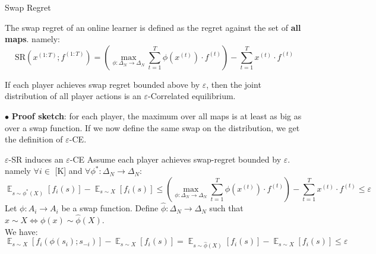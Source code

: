 \documentclass[aspectratio=169,xcolor=dvipsnames,t]{beamer}
\DeclareMathOperator*{\expectation}{\mathbb{E}}
\begin{document}
\begin{frame}[label=current]{Swap Regret}
    \begin{definition}
        The \color{MediumRed} swap regret \color{black} of an online learner is defined as the regret against the set of \textbf{all maps}. namely:
        \begin{equation*}
            \text{SR}(x^{(1:T)};f^{(1:T)}) = \left(\max_{\phi:\Delta_N\rightarrow\Delta_N} \sum_{t=1}^T \phi(x^{(t)})\cdot f^{(t)}\right) - \sum_{t=1}^T x^{(t)}\cdot f^{(t)}
        \end{equation*}
    \end{definition}
    \pause
    
    \begin{theorem}
        If each player achieves swap regret bounded above by $\varepsilon$, then the joint distribution of all player actions is an $\varepsilon$-Correlated equilibrium.
    \end{theorem}
    \pause
    
    $\bullet$ \textbf{Proof sketch}: for each player, the maximum over all maps is at least as big as over a \color{MediumGreen}swap function\color{black}. If we now define the same swap on the distribution, we get the definition of $\varepsilon$-CE.
\end{frame}

\begin{frame}[label=current1]{$\varepsilon$-SR induces an $\varepsilon$-CE}
    Assume each player achieves swap-regret bounded by $\varepsilon$. \pause
    namely $\forall i\in$ [K] and $\forall\phi^*:\Delta_N\rightarrow\Delta_N$:
    \begin{equation*}
        \expectation_{s\sim \phi^*(X)}[f_i(s)] - \expectation_{s\sim X}[f_i(s)]\leq\left(\max_{\phi:\Delta_N\rightarrow\Delta_N}\sum_{t=1}^T \phi(x^{(t)})\cdot f^{(t)}\right)-\sum_{t=1}^T x^{(t)}\cdot f^{(t)}\leq \varepsilon
    \end{equation*}
    \pause
    Let $\phi:A_i\rightarrow A_i$ be a swap function. Define $\hat{\phi}:\Delta_N\rightarrow\Delta_N$ such that $x\sim X \iff \phi(x)\sim\hat{\phi}(X)$.\\
    \pause We have:
    \begin{equation*}
        \expectation_{s\sim X}[f_i(\phi(s_i);s_{-i})]-\expectation_{s\sim X}[f_i(s)]=\expectation_{s\sim \hat{\phi}(X)}[f_i(s)] - \expectation_{s\sim X}[f_i(s)] \leq \varepsilon
    \end{equation*}
    
\end{frame}
\end{document}
